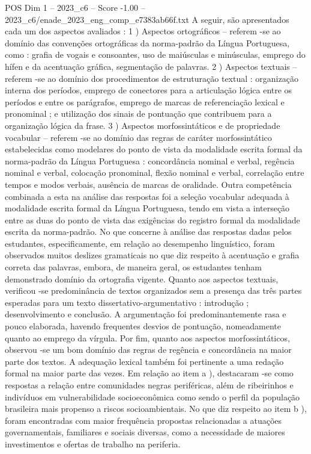\begin{textsample}{POS Dim 1 – 2023\_c6 – Score -1.00 – 2023\_c6/enade\_2023\_eng\_comp\_e7383ab66f.txt}
A seguir, são apresentados cada um dos aspectos avaliados : 1 ) Aspectos ortográficos – referem -se ao domínio das convenções ortográficas da norma-padrão da Língua Portuguesa, como : grafia de vogais e consoantes, uso de maiúsculas e minúsculas, emprego do hífen e da acentuação gráfica, segmentação de palavras. 2 ) Aspectos textuais – referem -se ao domínio dos procedimentos de estruturação textual : organização interna dos períodos, emprego de conectores para a articulação lógica entre os períodos e entre os parágrafos, emprego de marcas de referenciação lexical e pronominal ; e utilização dos sinais de pontuação que contribuem para a organização lógica da frase. 3 ) Aspectos morfossintáticos e de propriedade vocabular – referem -se ao domínio das regras de caráter morfossintático estabelecidas como modelares do ponto de vista da modalidade escrita formal da norma-padrão da Língua Portuguesa : concordância nominal e verbal, regência nominal e verbal, colocação pronominal, flexão nominal e verbal, correlação entre tempos e modos verbais, ausência de marcas de oralidade.
Outra competência combinada a esta na análise das respostas foi a seleção vocabular adequada à modalidade escrita formal da Língua Portuguesa, tendo em vista a interseção entre as duas do ponto de vista das exigências do registro formal da modalidade escrita da norma-padrão.
No que concerne à análise das respostas dadas pelos estudantes, especificamente, em relação ao desempenho linguístico, foram observados muitos deslizes gramaticais no que diz respeito à acentuação e grafia correta das palavras, embora, de maneira geral, os estudantes tenham demonstrado domínio da ortografia vigente.
Quanto aos aspectos textuais, verificou -se predominância de textos organizados sem a presença das três partes esperadas para um texto dissertativo-argumentativo : introdução ; desenvolvimento e conclusão.
A argumentação foi predominantemente rasa e pouco elaborada, havendo frequentes desvios de pontuação, nomeadamente quanto ao emprego da vírgula.
Por fim, quanto aos aspectos morfossintáticos, observou -se um bom domínio das regras de regência e concordância na maior parte dos textos.
A adequação lexical também foi pertinente a uma redação formal na maior parte das vezes.
Em relação ao item a ), destacaram -se como respostas a relação entre comunidades negras periféricas, além de ribeirinhos e indivíduos em vulnerabilidade socioeconômica como sendo o perfil da população brasileira mais propenso a riscos socioambientais.
No que diz respeito ao item b ), foram encontradas com maior frequência propostas relacionadas a atuações governamentais, familiares e sociais diversas, como a necessidade de maiores investimentos e ofertas de trabalho na periferia.

\end{textsample}
